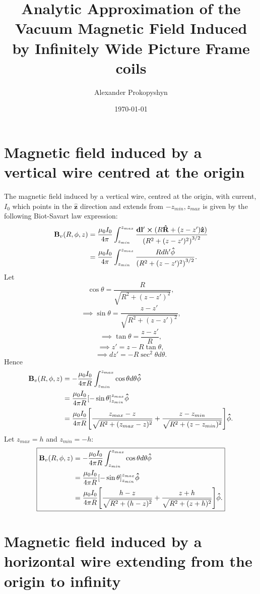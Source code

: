 \documentclass{article}
\title{Analytic Approximation of the Vacuum Magnetic Field Induced by Infinitely Wide Picture Frame coils}
\author{Alexander Prokopyshyn}
\date{\today}
\let\vec\mathbf
\begin{document}
\maketitle

\section{Magnetic field induced by a vertical wire centred at the origin}
\label{sec:vertical_wire_at_origin}

The magnetic field induced by a vertical wire, centred at the origin, with current, \(I_0\) which points in the 
\(\vec{\hat{z}}\) direction and extends from \(-z_{min}, z_{max}\) is given by the following Biot-Savart law expression:
\[\begin{aligned}
    \vec{B}_{v}(R, \phi, z) &= \frac{\mu_0 I_0}{4\pi}\int_{z_{min}}^{z_{max}}\frac{\vec{dl'}\cross(R\vec{\hat{R}} + (z-z')\vec{\hat{z}})}{\qty(R^2+(z-z')^2)^{3/2}} \\
    &= \frac{\mu_0 I_0}{4\pi}\int_{z_{min}}^{z_{max}}\frac{Rdh'\vec{\hat{\phi}}}{\qty(R^2+(z-z')^2)^{3/2}}.
\end{aligned}
\]
Let
\[\cos\theta = \frac{R}{\sqrt{R^2+(z-z')^2}},\]
\[\implies \sin\theta = \frac{z-z'}{\sqrt{R^2+(z-z')^2}},\]
\[\implies \tan \theta = \frac{z-z'}{R},\]
\[\implies z' = z - R\tan\theta,\]
\[\implies dz' = -R\sec^2\theta d\theta.\]
Hence
\[
\begin{aligned}
    \vec{B}_{v}(R, \phi, z) &= -\frac{\mu_0 I_0}{4\pi R}\int_{z_{min}}^{z_{max}}\cos\theta d\theta\vec{\hat{\phi}}\\
    &= \frac{\mu_0 I_0}{4\pi R}\qty[-\sin\theta]_{z_{min}}^{z_{max}}\vec{\hat{\phi}}\\
    &= \frac{\mu_0 I_0}{4\pi R}\qty[\frac{z_{max}-z}{\sqrt{R^2+(z_{max}-z)^2}} + \frac{z-z_{min}}{\sqrt{R^2+(z-z_{min})^2}}]\vec{\hat{\phi}}.
\end{aligned}\]
Let $z_{max}=h$ and $z_{min}=-h$:
\[
\boxed{\begin{aligned}
    \vec{B}_{v}(R, \phi, z) &= -\frac{\mu_0 I_0}{4\pi R}\int_{z_{min}}^{z_{max}}\cos\theta d\theta\vec{\hat{\phi}}\\
    &= \frac{\mu_0 I_0}{4\pi R}\qty[-\sin\theta]_{z_{min}}^{z_{max}}\vec{\hat{\phi}}\\
    &= \frac{\mu_0 I_0}{4\pi R}\qty[\frac{h-z}{\sqrt{R^2+(h-z)^2}} + \frac{z+h}{\sqrt{R^2+(z+h)^2}}]\vec{\hat{\phi}}.
\end{aligned}}\]

\section{Magnetic field induced by a horizontal wire extending from the origin to infinity}
\end{document}
